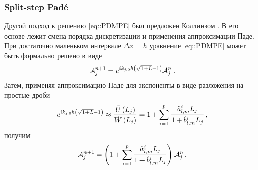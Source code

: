 \documentclass[../document.tex]{subfiles}
\begin{document}
        \subsubsection{Split-step Pad\'e}
            \par Другой подход к решению \eqref{eq::PDMPE} был предложен Коллинзом \cite{collins}. В его основе лежит смена порядка дискретизации и применения аппроксимации Паде. При достаточно маленьком интервале $\Delta x=h$ уравнение \eqref{eq::PDMPE} может быть формально решено в виде
            \begin{equation}
                \mathcal{A}_j^{n+1}=e^{ik_{j,0}h\left(\sqrt{1+L}-1\right)}\mathcal{A}_j^n\,.
            \end{equation}
            Затем, применяя аппроксимацию Паде для экспоненты в виде разложения на простые дроби
            \begin{equation}\label{eq::SSPADE}
                e^{ik_{j,0}h\left(\sqrt{1+L}-1\right)}\approx\frac{\tilde{U}\left(L_j\right)}{\tilde{W}\left(L_j\right)}= 1+\sum\limits_{i=1}^p\frac{\tilde{a}_{l,m}^iL_j}{1+\tilde{b}_{l,m}^iL_j}\,,
            \end{equation}
            получим
            \begin{equation}
                \mathcal{A}_j^{n+1}=\left(1+\sum\limits_{i=1}^p\frac{\tilde{a}_{l,m}^iL_j}{1+\tilde{b}_{l,m}^iL_j}\right)\mathcal{A}_j^n\,.
            \end{equation}
\end{document}
